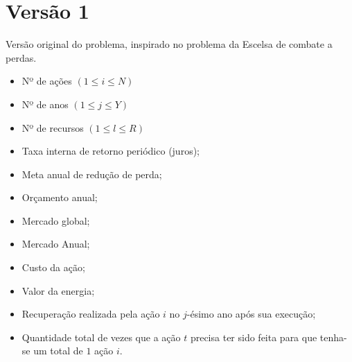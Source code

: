 \section{Versão 1}

Versão original do problema, inspirado no problema da Escelsa de combate a perdas.

\begin{itemize}
  \item {} Nº de ações {\scriptsize $(1 \leq i \leq N) $}
  \item {} Nº de anos  {\scriptsize $(1 \leq j \leq Y) $}
  \item {} Nº de recursos {\scriptsize $(1 \leq l \leq R)$}
\end{itemize}

\begin{itemize}
  \item {} Taxa interna de retorno periódico (juros);
\end{itemize}

\begin{itemize}
  \item {} Meta anual de redução de perda;
  \item {} Orçamento anual;
\end{itemize}

\begin{itemize}
  \item {} Mercado global;
  \item {} Mercado Anual;
  \item {} Custo da ação;
  \item {} Valor da energia;
  \item {} Recuperação realizada pela ação $i$ no $j$-ésimo ano
    após sua execução;
  \item {} Quantidade total de vezes que a ação $t$ precisa ter
    sido feita para que tenha-se um total de $1$ ação $i$.
\end{itemize}

